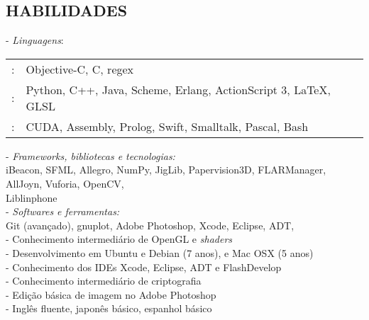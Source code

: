 \documentclass[]{res} %
\def \divspace{6pt}
\begin{document}
\begin{resume}

\section{HABILIDADES \hspace{\divspace} }


- {\sl Linguagens}: \\
\setlength\tabcolsep{2pt}
\begin{tabular}{l l}
\hspace*{1em}{\it Fluente}:& Objective-C, C, regex \\
\hspace*{1em}{\it Muito Familiar}:& Python, C++, Java, Scheme, Erlang, ActionScript 3, \LaTeX, GLSL \\
\hspace*{1em}{\it Pouco Familiar}:& CUDA, Assembly, Prolog, Swift, Smalltalk, Pascal, Bash \\
\end{tabular}

- {\sl Frameworks, bibliotecas e tecnologias:} \\
\hspace*{1em}iBeacon, SFML, Allegro, NumPy, JigLib, Papervision3D, FLARManager, AllJoyn, Vuforia, OpenCV, \\
\hspace*{1em}Liblinphone \\

- {\sl Softwares e ferramentas:} \\
\hspace*{1em} Git (avançado), gnuplot, Adobe Photoshop, Xcode, Eclipse, ADT, \\
- Conhecimento intermediário de OpenGL e {\it shaders} \\
- Desenvolvimento em Ubuntu e Debian (7 anos), e Mac OSX (5 anos) \\
- Conhecimento dos IDEs Xcode, Eclipse, ADT e FlashDevelop \\
- Conhecimento intermediário de criptografia \\
- Edição básica de imagem no Adobe Photoshop \\
- Inglês fluente, japonês básico, espanhol básico \\




\end{resume}
\end{document}
